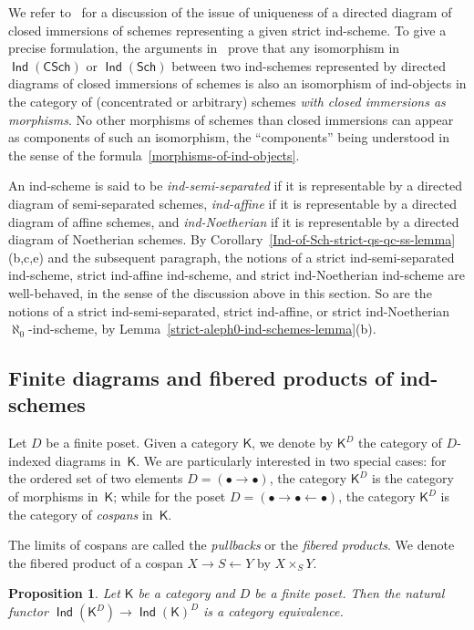 \documentclass[12pt,a4paper]{amsart}
\newcommand{\+}{\protect\nobreakdash-}
\renewcommand{\:}{\colon}
\newcommand{\rarrow}{\longrightarrow}
\newcommand{\larrow}{\longleftarrow}
\DeclareMathOperator{\Ind}{\mathsf{Ind}}
\newcommand{\Sch}{\mathsf{Sch}}
\newcommand{\CSch}{\mathsf{CSch}}
\newcommand{\sK}{\mathsf K}
\theoremstyle{plain}
\newtheorem{prop}[thm]{Proposition}
\theoremstyle{definition}
\begin{document}
 We refer to~\cite[Section~1.2]{Psemten} for a discussion of
the issue of uniqueness of a directed diagram of closed immersions
of schemes representing a given strict ind-scheme.
 To give a precise formulation, the arguments
in~\cite[Section~1.2]{Psemten} prove that any isomorphism in
$\Ind(\CSch)$ or $\Ind(\Sch)$ between two ind-schemes represented
by directed diagrams of closed immersions of schemes is also
an isomorphism of ind-objects in the category of (concentrated or
arbitrary) schemes \emph{with closed immersions as morphisms}.
 No other morphisms of schemes than closed immersions can appear as
components of such an isomorphism, the ``components'' being understood
in the sense of the formula~\eqref{morphisms-of-ind-objects}.

 An ind-scheme is said to be \emph{ind-semi-separated} if it is
representable by a directed diagram of semi-separated schemes,
\emph{ind-affine} if it is representable by a directed diagram
of affine schemes, and \emph{ind-Noetherian} if it is representable
by a directed diagram of Noetherian schemes.
 By Corollary~\ref{Ind-of-Sch-strict-qs-qc-ss-lemma}(b,c,e) and
the subsequent paragraph, the notions of a strict ind-semi-separated
ind-scheme, strict ind-affine ind-scheme, and strict ind-Noetherian
ind-scheme are well-behaved, in the sense of the discussion above
in this section.
 So are the notions of a strict ind-semi-separated, strict
ind-affine, or strict ind-Noetherian $\aleph_0$\+ind-scheme,
by Lemma~\ref{strict-aleph0-ind-schemes-lemma}(b).

\subsection{Finite diagrams and fibered products of ind-schemes}
\label{fibered-products-of-ind-schemes-subsecn}
 Let $D$ be a finite poset.
 Given a category $\sK$, we denote by $\sK^D$ the category of
$D$\+indexed diagrams in~$\sK$.
 We are particularly interested in two special cases: for the ordered
set of two elements $D=(\bullet\to\bullet)$, the category $\sK^D$ is
the category of morphisms in~$\sK$; while for the poset
$D=(\bullet\rightarrow\bullet\leftarrow\bullet)$, the category
$\sK^D$ is the category of \emph{cospans} in~$\sK$.

 The limits of cospans are called the \emph{pullbacks} or
the \emph{fibered products}.
 We denote the fibered product of a cospan $X\rarrow S\larrow Y$
by $X\times_SY$.

\begin{prop} \label{finite-diagrams-in-ind-objects}
 Let\/ $\sK$ be a category and $D$ be a finite poset.
 Then the natural functor\/ $\Ind(\sK^D)\rarrow\Ind(\sK)^D$
is a category equivalence.
\end{prop}
\end{document}
